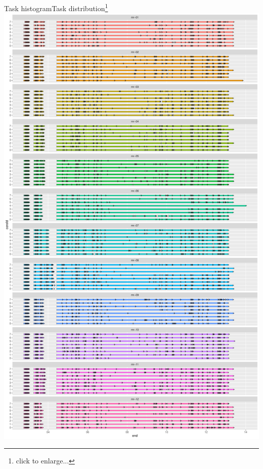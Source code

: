 \documentclass{beamer}
\begin{document}
\begin{frame}{Task histogram}{Task distribution\footnote{\tiny click to enlarge...}}
  \centering
  \href{https://www.cs.ucr.edu/~acald013/public/Research/Figures/TasksHist17.pdf}{\includegraphics[scale=0.125]{figures/TasksHist17}}
\end{frame}
\end{document}
